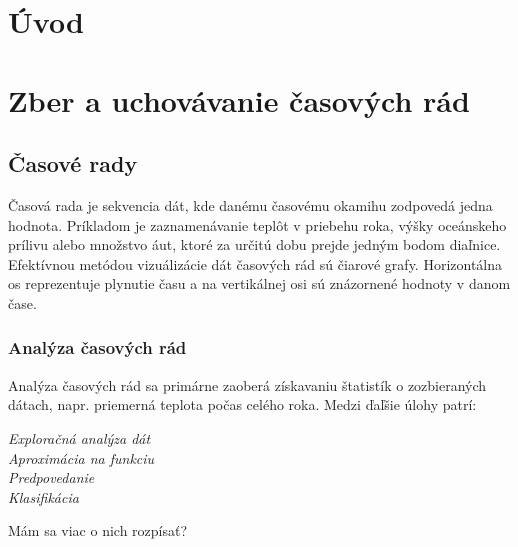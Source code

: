 \documentclass[11pt,final,oneside]{fithesis}
\begin{document}
\FrontMatter
\ThesisTitlePage

\begin{ThesisDeclaration}
\DeclarationText
\AdvisorName
\end{ThesisDeclaration}


\begin{ThesisThanks}
\end{ThesisThanks}

\begin{ThesisAbstract}
\end{ThesisAbstract}

\begin{ThesisKeyWords}
\end{ThesisKeyWords}

\tableofcontents
{}

\MainMatter
\chapter{Úvod}

\chapter{Zber a uchovávanie časových rád}
\section{Časové rady}
Časová rada je sekvencia dát, kde danému časovému okamihu zodpovedá jedna hodnota. Príkladom je zaznamenávanie teplôt v priebehu roka, výšky oceánskeho prílivu alebo množstvo áut, ktoré za určitú dobu
prejde jedným bodom diaľnice. Efektívnou metódou vizuálizácie dát časových rád sú čiarové grafy. Horizontálna os reprezentuje plynutie času a na vertikálnej osi sú znázornené hodnoty v danom čase.

\subsection{Analýza časových rád}
Analýza časových rád sa primárne zaoberá získavaniu štatistík o zozbieraných dátach, napr. priemerná teplota počas celého roka. Medzi ďaľšie úlohy patrí:
\begin{description}
\item[\emph{Exploračná analýza dát}]
\item[\emph{Aproximácia na funkciu}] 
\item[\emph{Predpovedanie}] 
\item[\emph{Klasifikácia}] 
\end{description}
Mám sa viac o nich rozpísať?
\end{document}
